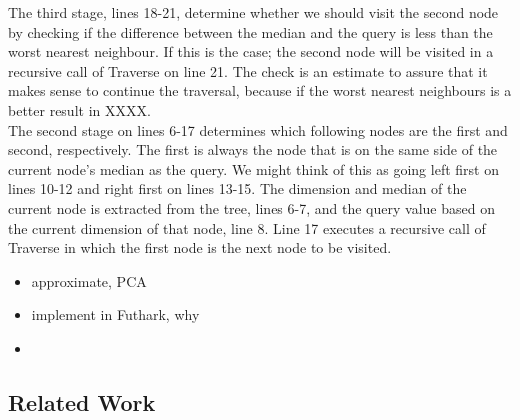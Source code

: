 The third stage, lines 18-21, determine whether we should visit the second node by checking if the difference between the median and the query is less than the worst nearest neighbour. If this is the case; the second node will be visited in a recursive call of Traverse on line 21. The check is an estimate to assure that it makes sense to continue the traversal, because if the worst nearest neighbours is a better result in XXXX. 
~~
\\[2mm]
The second stage on lines 6-17 determines which following nodes are the first and second, respectively. The first is always the node that is on the same side of the current node's median as the query. We might think of this as going left first on lines 10-12 and right first on lines 13-15. The dimension and median of the current node is extracted from the tree, lines 6-7, and the query value based on the current dimension of that node, line 8. Line 17 executes a recursive call of Traverse in which the first node is the next node to be visited.

\begin{itemize}
	\item approximate, PCA
	\item implement in Futhark, why
	\item 
\end{itemize}








\subsection{Related Work}


